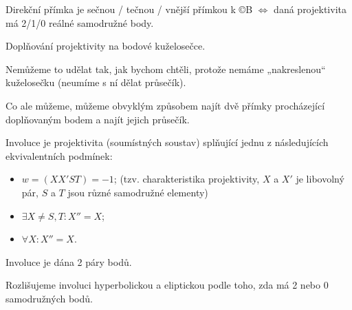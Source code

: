 \documentclass[12pt]{article}					%
\begin{document}
\begin{poznamka}
	Direkční přímka je sečnou / tečnou / vnější přímkou k ©B $\Leftrightarrow$ daná projektivita má 2/1/0 reálné samodružné body.
\end{poznamka}

\begin{priklad}[Konstrukce]
	Doplňování projektivity na bodové kuželosečce.

	\begin{reseni}
		Nemůžeme to udělat tak, jak bychom chtěli, protože nemáme „nakreslenou“ kuželosečku (neumíme s ní dělat průsečík).

		Co ale můžeme, můžeme obvyklým způsobem najít dvě přímky procházející doplňovaným bodem a najít jejich průsečík.
	\end{reseni}
\end{priklad}

\begin{definice}
	Involuce je projektivita (soumístných soustav) splňující jednu z následujících ekvivalentních podmínek:
	\begin{itemize}
		\item $w = (XX'ST) = -1$; (tzv. charakteristika projektivity, $X$ a $X'$ je libovolný pár, $S$ a $T$ jsou různé samodružné elementy)
		\item $\exists X ≠ S, T: X'' = X$;
		\item $\forall X: X'' = X$.
	\end{itemize}
\end{definice}

\begin{poznamka}
	Involuce je dána 2 páry bodů.

	Rozlišujeme involuci hyperbolickou a eliptickou podle toho, zda má 2 nebo 0 samodružných bodů.
\end{poznamka}
\end{document}
